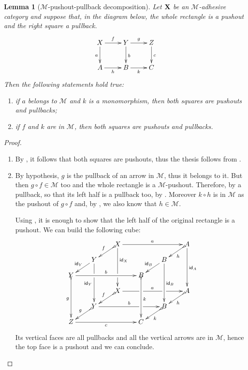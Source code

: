 \documentclass[a4paper]{article}
\newcommand{\id}[1]{\mathsf{id}_{#1}}
\def\X{\textbf {\textup{X}}}
\def\Y{\textbf {\textup{Y}}}
\newtheorem{lemma}[theorem]{Lemma}
\theoremstyle{definition}
\begin{document}
\begin{lemma}[$\mathcal{M}$-pushout-pullback decomposition]\label{lem:popb} Let $\X$ be an $\mathcal{M}$-adhesive category  and suppose that, in the diagram below, the whole rectangle is a pushout and the right square a pullback.
\[\xymatrix{X \ar[d]_{a} \ar[r]^{f}& \ar[r]^{g} Y \ar[d]^{b}& Z \ar[d]^{c}\\ A \ar[r]_{h}& B \ar[r]_{k}& C}\]
	Then the following statements hold true:
	\begin{enumerate}
\item if $a$ belongs to $\mathcal{M}$ and $k$ is a monomorphism,  then both squares are pushouts and pullbacks;
\item if $f$ and $k $ are in  $\mathcal{M}$, then both squares are pushouts and pullbacks.
	\end{enumerate}
\end{lemma}
\begin{proof}
\begin{enumerate}
	\item By , it follows that both squares are pushouts, thus the thesis follows from .
	\item By hypothesis, $g$ is the pullback of an arrow in $\mathcal{M}$, thus it belongs to it. But then $g\circ f\in \mathcal{M}$ too  and the whole rectangle is a $\mathcal{M}$-pushout. Therefore, by  a pullback, so that its left half is a pullback too, by . Moreover $k\circ h$ is in $\mathcal{M}$ as the pushout of $g\circ f$ and, by , we also know that $h\in \mathcal{M}$.  
	
	Using , it is enough to show that the left half of the original rectangle is a pushout. We can build the following cube:
	\[\xymatrix@C=20pt@R=10pt{ & &X\ar@{>->}[dl]_{f} \ar[ddd]^(.333333){\id{X}}|(.666666)\hole\ar[rrr]^{a} &&&A \ar[ddd]^{\id{A}} \ar@{>->}[dl]^{h}\\& Y\ar[dl]_{\id{Y}} \ar[ddd]|(.333333)\hole_{\id{Y}} &&&B \ar[ddd]^{\id{B}} \ar[dl]_{\id{B}} \\Y \ar@{>->}[ddd]_{g} \ar[rrr]^{b}&&& B\ar@{>->}[ddd]^{k}\\&&X \ar[rrr]|(.34)\hole^{a}|(.67)\hole \ar@{>->}[dl]_{f}&&& A \ar@{>->}[dl]^{h}\\ & Y \ar[rrr]|(.67)\hole^{b} \ar@{>->}[dl]_{g}&&& B \ar@{>->}[dl]^{k}\\ Z\ar[rrr]_{c} &&& C}\]
	Its vertical faces are all pullbacks and all the vertical arrows are in $\mathcal{M}$, hence the top face is a pushout and we can conclude. \qedhere 
\end{enumerate}
\end{proof}
\end{document}
